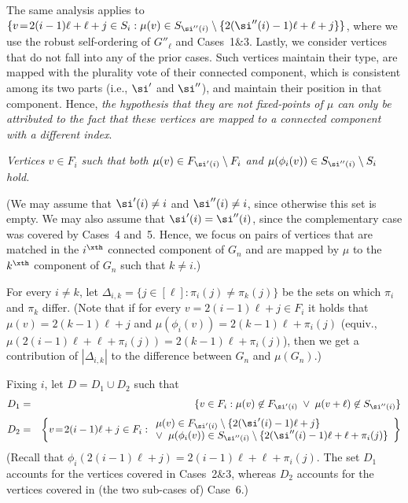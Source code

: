 The same analysis applies to
$\{v\!=\!2(i-1)\ell+\ell+j\in S_i:
  \mu(v)\in S_{\si''(i)}\setminus\{2(\si''(i)-1)\ell+\ell+j\}\}$,
where we use the robust self-ordering of $G''_\ell$
and Cases~1\&3.
%
%
\EDes
Lastly, we consider vertices that do not fall into any of
the prior cases. Such vertices maintain their type,
are mapped with the plurality vote of their connected component,
which is consistent among its two parts (i.e., $\si'$ and $\si''$),
and maintain their position in that component.
Hence, {\em the hypothesis that they are not fixed-points of $\mu$
can only be attributed to the fact that these vertices are
mapped to a connected component with a different index}.

\BDes
\item[{\em Case 7}:]
{\em Vertices $v\in F_i$ such that
both $\mu(v)\in F_{\si'(i)}\setminus F_{i}$
and $\mu(\phi_i(v))\in S_{\si''(i)}\setminus S_{i}$ hold.}
%

(We may assume that $\si'(i)\neq i$ and $\si''(i)\neq i$,
since otherwise this set is empty.
%
%
%
%
We may also assume that $\si'(i)=\si''(i)$,
since the complementary case was covered by Cases~4 and~5.
Hence, we focus on pairs of vertices that are
matched in the $i^\xth$ connected component of $G_n$
and are mapped by $\mu$ to the $k^\xth$ component of $G_n$
such that $k\neq i$.)

For every $i\neq k$,
let $\Delta_{i,k}=\{j\in[\ell]:\pi_i(j)\neq\pi_{k}(j)\}$
be the sets on which $\pi_i$ and $\pi_k$ differ.
(Note that if for every $v=2(i-1)\ell+j\in F_i$
it holds that $\mu(v)=2(k-1)\ell+j$
and $\mu(\phi_i(v))=2(k-1)\ell+\pi_i(j)$
(equiv., $\mu(2(i-1)\ell+\ell+\pi_i(j))=2(k-1)\ell+\pi_i(j)$),
then we get a contribution of $|\Delta_{i,k}|$
to the difference between $G_n$ and $\mu(G_n)$.)

%
Fixing $i$, let $D=D_1\cup D_2$ such that
\begin{eqnarray*}
%
%
%
%
%
%
%
D_1&=& \{v\in F_i:\mu(v)\not\in F_{\si'(i)}\;\vee\;
                 \mu(v+\ell)\not\in S_{\si''(i)}\} \\[3pt]
D_2&=& \left\{v\!=\!2(i-1)\ell+j\in F_i:
        \begin{array}{l}
         \mu(v)\in F_{\si'(i)}\setminus\{2(\si'(i)-1)\ell+j\} \\
         \vee\;\;
         \mu(\phi_i(v))
              \in S_{\si''(i)}\setminus\{2(\si''(i)-1)\ell+\ell+\pi_i(j)\}
        \end{array}\right\}
\end{eqnarray*}
(Recall that $\phi_i(2(i-1)\ell+j)=2(i-1)\ell+\ell+\pi_i(j)$.
The set $D_1$ accounts for the vertices covered in Cases~2\&3,
whereas $D_2$ accounts for the vertices covered in
(the two sub-cases of) Case~6.)

